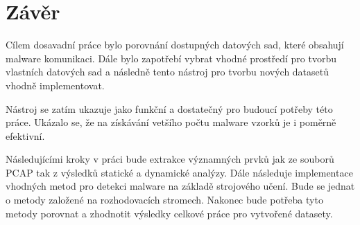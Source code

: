     
\chapter{Závěr}
Cílem dosavadní práce bylo porovnání dostupných datových sad, které obsahují malware komunikaci. Dále bylo zapotřebí vybrat vhodné prostředí 
pro tvorbu vlastních datových sad a následně tento nástroj pro tvorbu nových datasetů vhodně implementovat. 

Nástroj se zatím ukazuje jako funkční a dostatečný pro budoucí potřeby této práce. Ukázalo se, že na získávání vetšího počtu malware vzorků je i poměrně efektivní.

Následujícími kroky v práci bude extrakce významných prvků jak ze souborů PCAP tak z výsledků statické a dynamické analýzy.
Dále následuje implementace vhodných metod pro detekci malware na základě strojového učení. Bude se jednat o metody založené na rozhodovacích stromech.
Nakonec bude potřeba tyto metody porovnat a zhodnotit výsledky celkové práce pro vytvořené datasety.



%
